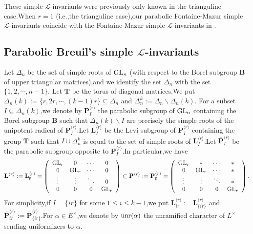 \documentclass[SecEq,CM,GP]{degruyter-crelle} %
\theoremstyle{plain}
\newcommand{\GLN}{{\rm GL}}
\newcommand{\lrr}{{\langle r\rangle}}
\newcommand{\op}{{\overline{{\mathbf{P}}}}}
\newcommand{\unr}{{\rm unr}}
\newcommand{\bB}{{\mathbf{B}}}
\newcommand{\bL}{{\mathbf{L}}}
\newcommand{\bP}{{\mathbf{P}}}
\newcommand{\bT}{{\mathbf{T}}}
\newcommand{\sL}{\mathcal L}
\begin{document}
These simple $\sL$-invariants were previously only known in the trianguline case.\;When $r=1$ (i.e.,\;the trianguline case),\;our parabolic Fontaine-Mazur simple $\sL$-invariants coincide with the Fontaine-Mazur simple  $\sL$-invariants in \cite[Page 7994]{2019DINGSimple}.\;


\subsection*{Parabolic Breuil's simple $\sL$-invariants \cite{2022ext1hyq}}


Let $\Delta_n$ be the set of simple roots of $\GLN_n$ (with respect to the Borel subgroup $\bB$ of upper triangular matrices),\;and we identify the set $\Delta_n$ with the set $\{1,2,\cdots,n-1\}$. Let $\bT$ be the torus of diagonal matrices.\;We put  $\Delta_n(k):=\{r,2r,\cdots,(k-1)r\}\subseteq \Delta_n$ and $\Delta_n^k:=\Delta_n\backslash \Delta_n(k)$. For a subset $I\subseteq \Delta_n(k)$,\;we denote by $\bP_I^{\lrr}$ the parabolic subgroup of $\GLN_n$ containing the Borel subgroup $\bB$  such that $\Delta_n(k) \backslash  I$ are precisely the simple roots of the unipotent radical of $\mathbf{P}_I^{\lrr}$.\;Let $\bL_I^{\lrr}$ be the Levi subgroup of $\bP_I^{\lrr}$ containing the group $\bT$ such that  $I\cup \Delta_n^k$ is equal to the set of simple roots of  $\bL_I^{\lrr}$.\;Let $\op_I^{\lrr}$ be the parabolic subgroup opposite to $\bP_I^{\lrr}$.\;In particular,\;we have 
\[\bL^{\lrr}:=\bL^{\lrr}_{\emptyset}=\left(\begin{array}{cccc}
	\GLN_r & 0 & \cdots & 0 \\
	0 & \GLN_r & \cdots & 0 \\
	\vdots & \vdots & \ddots & 0 \\
	0 & 0 & 0 & \GLN_r \\
\end{array}\right)\subset \bP^{\lrr}:=\bP^{\lrr}_{\emptyset}=\left(\begin{array}{cccc}
	\GLN_r & \ast & \cdots & \ast \\
	0 & \GLN_r & \cdots & \ast \\
	\vdots & \vdots & \ddots & \ast \\
	0 & 0 & 0 & \GLN_r \\
\end{array}\right).\]
For simplicity,\;if $I=\{ir\}$ for some $1\leq i\leq k-1$,\;we put $\bL^{\lrr}_{ir}:=\bL^{\lrr}_{\{ir\}}$ and $\op^{\lrr}_{ir}:=\op^{\lrr}_{\{ir\}}$.\;For $\alpha\in E^\times$,\;we denote by $\unr(\alpha)$ the unramified character of $L^\times$ sending uniformizers to $\alpha$.\;
\end{document}
